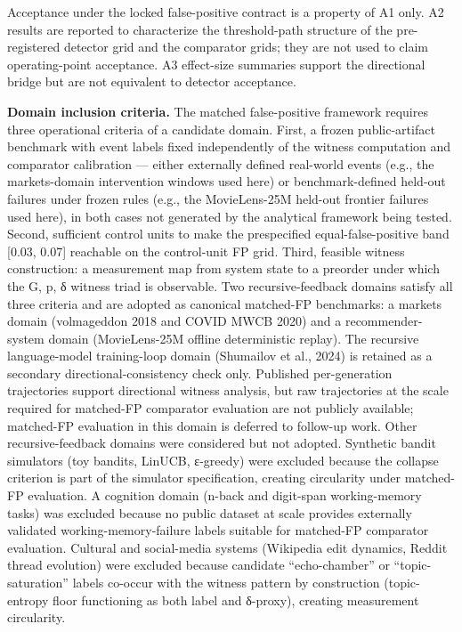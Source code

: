 \documentclass[
  11pt,
]{article}
\begin{document}
Acceptance under the locked false-positive contract is a property of A1
only. A2 results are reported to characterize the threshold-path
structure of the pre-registered detector grid and the comparator grids;
they are not used to claim operating-point acceptance. A3 effect-size
summaries support the directional bridge but are not equivalent to
detector acceptance.

\textbf{Domain inclusion criteria.} The matched false-positive framework
requires three operational criteria of a candidate domain. First, a
frozen public-artifact benchmark with event labels fixed independently
of the witness computation and comparator calibration --- either
externally defined real-world events (e.g., the markets-domain
intervention windows used here) or benchmark-defined held-out failures
under frozen rules (e.g., the MovieLens-25M held-out frontier failures
used here), in both cases not generated by the analytical framework
being tested. Second, sufficient control units to make the prespecified
equal-false-positive band {[}0.03, 0.07{]} reachable on the control-unit
FP grid. Third, feasible witness construction: a measurement map from
system state to a preorder under which the G, p, δ witness triad is
observable. Two recursive-feedback domains satisfy all three criteria
and are adopted as canonical matched-FP benchmarks: a markets domain
(volmageddon 2018 and COVID MWCB 2020) and a recommender-system domain
(MovieLens-25M offline deterministic replay). The recursive
language-model training-loop domain (Shumailov et al., 2024) is retained
as a secondary directional-consistency check only. Published
per-generation trajectories support directional witness analysis, but
raw trajectories at the scale required for matched-FP comparator
evaluation are not publicly available; matched-FP evaluation in this
domain is deferred to follow-up work. Other recursive-feedback domains
were considered but not adopted. Synthetic bandit simulators (toy
bandits, LinUCB, ε-greedy) were excluded because the collapse criterion
is part of the simulator specification, creating circularity under
matched-FP evaluation. A cognition domain (n-back and digit-span
working-memory tasks) was excluded because no public dataset at scale
provides externally validated working-memory-failure labels suitable for
matched-FP comparator evaluation. Cultural and social-media systems
(Wikipedia edit dynamics, Reddit thread evolution) were excluded because
candidate ``echo-chamber'' or ``topic-saturation'' labels co-occur with
the witness pattern by construction (topic-entropy floor functioning as
both label and δ-proxy), creating measurement circularity.
\end{document}

